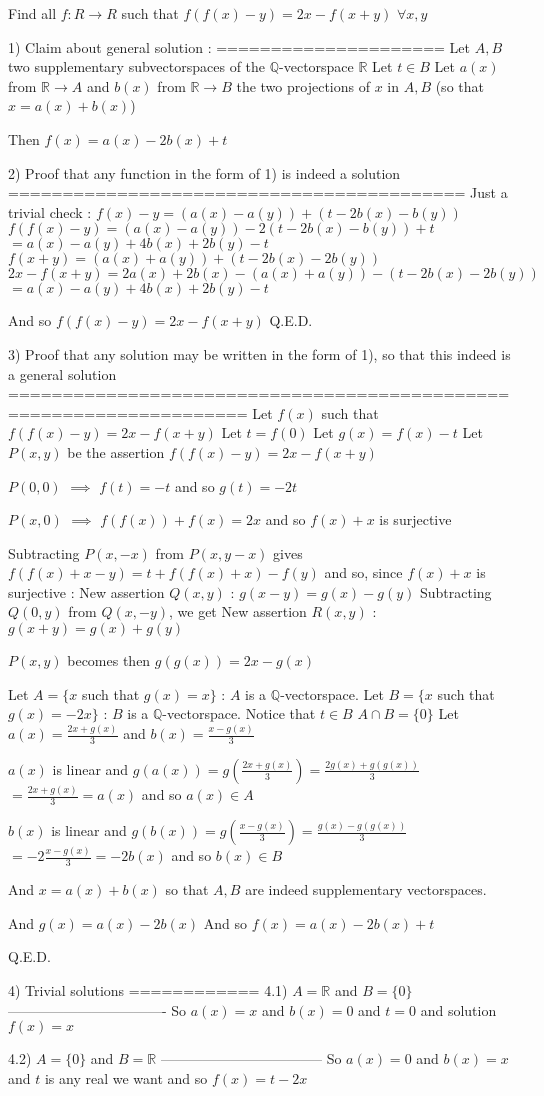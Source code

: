 \begin{solution}
	\begin{tcolorbox}Find all $ f: R \to R $ such that $ f(f(x)-y) = 2x - f(x+y)$    $ \forall x,y$\end{tcolorbox}
1) Claim about general solution :
=====================
Let $A,B$ two supplementary subvectorspaces of the $\mathbb Q$-vectorspace $\mathbb R$
Let $t\in B$
Let $a(x)$ from $\mathbb R\to A$ and $b(x)$ from $\mathbb R\to B$ the two projections of $x$ in $A,B$ (so that $x=a(x)+b(x)$)

Then $\boxed{f(x)=a(x)-2b(x)+t}$

2) Proof that any function in the form of 1) is indeed a solution
==========================================
Just a trivial check :
$f(x)-y=(a(x)-a(y))+(t-2b(x)-b(y))$
$f(f(x)-y)=(a(x)-a(y))-2(t-2b(x)-b(y))+t$ $=a(x)-a(y)+4b(x)+2b(y)-t$
$f(x+y)=(a(x)+a(y))+(t-2b(x)-2b(y))$
$2x-f(x+y)=2a(x)+2b(x)-(a(x)+a(y))-(t-2b(x)-2b(y))$ $=a(x)-a(y)+4b(x)+2b(y)-t$

And so $f(f(x)-y)=2x-f(x+y)$
Q.E.D.

3) Proof that any solution may be written in the form of 1), so that this indeed is a general solution
====================================================================
Let $f(x)$ such that $f(f(x)-y)=2x-f(x+y)$
Let $t=f(0)$
Let $g(x)=f(x)-t$
Let $P(x,y)$ be the assertion $f(f(x)-y)=2x-f(x+y)$

$P(0,0)$ $\implies$ $f(t)=-t$ and so $g(t)=-2t$

$P(x,0)$ $\implies$  $f(f(x))+f(x)=2x$ and so $f(x)+x$ is surjective

Subtracting $P(x,-x)$ from $P(x,y-x)$ gives $f(f(x)+x-y)=t+f(f(x)+x)-f(y)$ and so, since $f(x)+x$ is surjective :
New assertion $Q(x,y)$ : $g(x-y)=g(x)-g(y)$ 
Subtracting $Q(0,y)$ from $Q(x,-y)$, we get
New assertion $R(x,y)$ : $g(x+y)=g(x)+g(y)$

$P(x,y)$ becomes then $g(g(x))=2x-g(x)$

Let $A=\{x$ such that $g(x)=x\}$ : $A$ is a $\mathbb Q$-vectorspace.
Let $B=\{x$ such that $g(x)=-2x\}$ : $B$ is a $\mathbb Q$-vectorspace. Notice that $t\in B$
$A\cap B=\{0\}$
Let $a(x)=\frac {2x+g(x)}3$ and $b(x)=\frac{x-g(x)}3$

$a(x)$ is linear and $g(a(x))=g(\frac {2x+g(x)}3)=\frac{2g(x)+g(g(x))}3$ $=\frac{2x+g(x)}3=a(x)$ and so $a(x)\in A$

$b(x)$ is linear and $g(b(x))=g(\frac{x-g(x)}3)=\frac{g(x)-g(g(x))}3$ $=-2\frac{x-g(x)}3=-2b(x)$ and so $b(x)\in B$

And $x=a(x)+b(x)$ so that $A,B$ are indeed supplementary vectorspaces.

And $g(x)=a(x)-2b(x)$
And so $f(x)=a(x)-2b(x)+t$

Q.E.D.

4) Trivial solutions
============
4.1) $A=\mathbb R$ and $B=\{0\}$
----------------------------------
So $a(x)=x$ and $b(x)=0$ and $t=0$ and solution $\boxed{f(x)=x}$

4.2) $A=\{0\}$ and $B=\mathbb R$
-----------------------------------
So $a(x)=0$ and $b(x)=x$ and $t$ is any real we want and so $\boxed{f(x)=t-2x}$
\end{solution}
